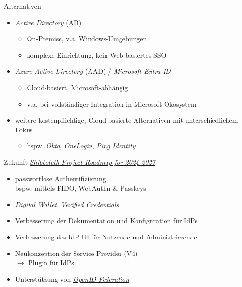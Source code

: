 \begin{frame}{Alternativen}
    \begin{itemize}
        \item \emph{Active Directory} (AD)
        \begin{itemize}
            \item On-Premise, v.a. Windows-Umgebungen
            \item komplexe Einrichtung, kein Web-basiertes SSO~\cite{sommergutWasSindUnterschiede2019}
        \end{itemize}

        \pause

        \item \emph{Azure Active Directory} (AAD) / \emph{Microsoft Entra ID}
        \begin{itemize}
            \item Cloud-basiert, Microsoft-abhängig
            \item v.a. bei vollständiger Integration in Microsoft-Ökosystem~\cite{sommergutWasSindUnterschiede2019}
        \end{itemize}

        \pause

        \item weitere kostenpflichtige, Cloud-basierte Alternativen mit unterschiedlichem Fokus
        \begin{itemize}
            \item bspw. \emph{Okta}, \emph{OneLogin}, \emph{Ping Identity}~\cite{oktaSecureSingleSignOn, oneloginErweiterteAuthentifizierung, pingidentityFunktionenPingIdentityPlattform}
        \end{itemize}
    \end{itemize}
\end{frame}


\begin{frame}{Zukunft}
    \href{https://shibboleth.atlassian.net/wiki/spaces/DEV/pages/3503423489/Project+Roadmap}{\emph{Shibboleth Project Roadmap for 2024-2027}}

    \begin{itemize}
        \item passwortlose Authentifizierung\\bspw. mittels FIDO, WebAuthn \& Passkeys
        \item \emph{Digital Wallet}, \emph{Verified Credentials}
        \item Verbesserung der Dokumentation und Konfiguration für IdPs
        \item Verbesserung des IdP-UI für Nutzende und Administrierende
        \item Neukonzeption der Service Provider (V4)\\$\to$ Plugin für IdPs
        \item Unterstützung von \href{https://openid.net/foundation/}{\emph{OpenID Federation}}~\cite{shibbolethDevelopmentCenterProject2024}
    \end{itemize}
\end{frame}
